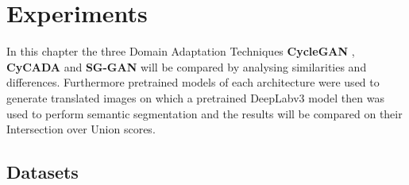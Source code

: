 \chapter{Experiments}
\label{sec:experiments}

In this chapter the three Domain Adaptation Techniques \textbf{CycleGAN} \cite{DBLP:journals/corr/ZhuPIE17}, \textbf{CyCADA} \cite{DBLP:journals/corr/abs-1711-03213} and \textbf{SG-GAN} \cite{DBLP:journals/corr/abs-1801-01726} will be compared by analysing similarities and differences. Furthermore pretrained models of each architecture were used to generate translated images on which a pretrained DeepLabv3 \cite{DBLP:journals/corr/ChenPSA17} model then was used to perform semantic segmentation and the results will be compared on their Intersection over Union scores.


\section{Datasets}

